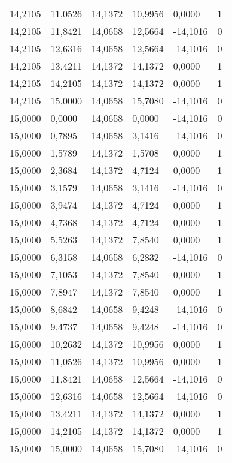 \begin{longtable}{@{}llllll@{}}
		14,2105 & 11,0526 & 14,1372 & 10,9956 & 0,0000   & 1  \\
		14,2105 & 11,8421 & 14,0658 & 12,5664 & -14,1016 & 0  \\
		14,2105 & 12,6316 & 14,0658 & 12,5664 & -14,1016 & 0  \\
		14,2105 & 13,4211 & 14,1372 & 14,1372 & 0,0000   & 1  \\
		14,2105 & 14,2105 & 14,1372 & 14,1372 & 0,0000   & 1  \\
		14,2105 & 15,0000 & 14,0658 & 15,7080 & -14,1016 & 0  \\
		15,0000 & 0,0000  & 14,0658 & 0,0000  & -14,1016 & 0  \\
		15,0000 & 0,7895  & 14,0658 & 3,1416  & -14,1016 & 0  \\
		15,0000 & 1,5789  & 14,1372 & 1,5708  & 0,0000   & 1  \\
		15,0000 & 2,3684  & 14,1372 & 4,7124  & 0,0000   & 1  \\
		15,0000 & 3,1579  & 14,0658 & 3,1416  & -14,1016 & 0  \\
		15,0000 & 3,9474  & 14,1372 & 4,7124  & 0,0000   & 1  \\
		15,0000 & 4,7368  & 14,1372 & 4,7124  & 0,0000   & 1  \\
		15,0000 & 5,5263  & 14,1372 & 7,8540  & 0,0000   & 1  \\
		15,0000 & 6,3158  & 14,0658 & 6,2832  & -14,1016 & 0  \\
		15,0000 & 7,1053  & 14,1372 & 7,8540  & 0,0000   & 1  \\
		15,0000 & 7,8947  & 14,1372 & 7,8540  & 0,0000   & 1  \\
		15,0000 & 8,6842  & 14,0658 & 9,4248  & -14,1016 & 0  \\
		15,0000 & 9,4737  & 14,0658 & 9,4248  & -14,1016 & 0  \\
		15,0000 & 10,2632 & 14,1372 & 10,9956 & 0,0000   & 1  \\
		15,0000 & 11,0526 & 14,1372 & 10,9956 & 0,0000   & 1  \\
		15,0000 & 11,8421 & 14,0658 & 12,5664 & -14,1016 & 0  \\
		15,0000 & 12,6316 & 14,0658 & 12,5664 & -14,1016 & 0  \\
		15,0000 & 13,4211 & 14,1372 & 14,1372 & 0,0000   & 1  \\
		15,0000 & 14,2105 & 14,1372 & 14,1372 & 0,0000   & 1  \\
		15,0000 & 15,0000 & 14,0658 & 15,7080 & -14,1016 & 0  \\ \bottomrule
\end{longtable}
